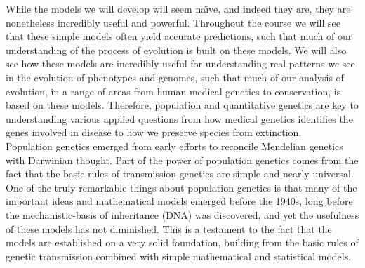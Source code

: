 
While the models we will develop will seem na\"{\i}ve, and indeed they are, they are
nonetheless incredibly useful and powerful. Throughout the course we will see
that these simple models often yield accurate predictions, such that much of our
understanding of the process of evolution is built on these models. We will
also see how these models are incredibly useful for understanding real patterns
we see in the evolution of phenotypes and genomes, such that much of our
analysis of evolution, in a range of areas from human medical genetics to conservation,
is based on these models. Therefore, population and quantitative genetics are key to
understanding various applied questions from how medical genetics identifies
the genes involved in disease to how we preserve species from extinction. \\

Population genetics emerged from early efforts to
reconcile Mendelian genetics with Darwinian thought.
Part of the power of
population genetics comes from the fact that the basic rules of
transmission genetics are simple and nearly universal.  One of the truly remarkable things about population genetics is that
many of the important ideas and mathematical models emerged before the
1940s, long before the
mechanistic-basis of inheritance (DNA) was discovered, and yet the
usefulness of these models has not diminished. This is a testament to
the fact that the models are established on a very solid foundation,
building from the basic rules of genetic transmission combined with
simple mathematical and statistical models.   

